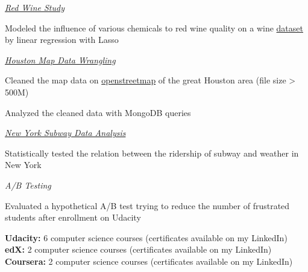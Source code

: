 \documentclass[12pt,letterpaper]{article}
\newenvironment{itemize*}%
{\begin{itemize}%
  \setlength{\itemsep}{0pt}}%
{\end{itemize}}
\newcommand{\mhead}[1]{\leavevmode\marginpar{\sffamily\footnotesize #1}}
\begin{document}
\smallskip
\href{https://github.com/tcya/what-affects-red-wine-quality}{\emph{Red Wine Study}}
\begin{itemize*}
  \item Modeled the influence of various chemicals to red wine quality on a wine \href{https://s3.amazonaws.com/udacity-hosted-downloads/ud651/wineQualityInfo.txt}{dataset} by linear regression with Lasso
\end{itemize*}

\smallskip
\href{https://github.com/tcya/houston-mapdata-wrangling}{\emph{Houston Map Data Wrangling}}
\begin{itemize*}
  \item Cleaned the map data on \href{www.openstreetmap.org}{openstreetmap} of the great Houston area (file size > 500M)
  \item Analyzed the cleaned data with MongoDB queries
\end{itemize*}

\smallskip
\href{https://github.com/tcya/new-york-subway-data-analysis}{\emph{New York Subway Data Analysis}}
\begin{itemize*}
  \item Statistically tested the relation between the ridership of subway and weather in New York
\end{itemize*}

\smallskip
\emph{A/B Testing}
\begin{itemize*}
  \item Evaluated a hypothetical A/B test trying to reduce the number of frustrated students after enrollment on Udacity
\end{itemize*}

\bigskip
\mhead{Independent \newline Coursework}%
\textbf{Udacity:} 6 computer science courses (certificates available on my LinkedIn) \\
\textbf{edX:} 2 computer science courses (certificates available on my LinkedIn)\\
\textbf{Coursera:} 2 computer science courses (certificates available on my LinkedIn)

\bigskip
\end{document}
